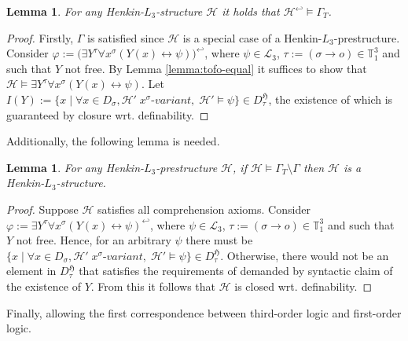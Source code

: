 \documentclass[11pt,a4paper]{article}
\newtheorem{lemma}[theorem]{Lemma}
\newcommand{\tofo}{\hookleftarrow}
\begin{document}
\begin{lemma}
\label{lemma:gammaT-sat}
For any Henkin-$L_3$-structure $\mathcal{H}$  it holds that $\mathcal{H}^{\tofo} \models \Gamma_T$.
\end{lemma}
\begin{proof}
Firstly, $\Gamma$ is satisfied since $\mathcal{H}$ is a special case of a Henkin-$L_3$-prestructure. Consider $\varphi:=\big( \exists Y^{\tau} \forall x^{\sigma} (Y(x) \leftrightarrow \psi)\big)^{\tofo}$, where $\psi \in \mathcal{L}_3$,  $\tau:= (\sigma \to o) \in \mathbb{T}_1^3$ and such that $Y$ not free. By Lemma \ref{lemma:tofo-equal} it suffices to show that $\mathcal{H} \models \exists Y^{\tau} \forall x^{\sigma} (Y(x) \leftrightarrow \psi)$. Let  $I(Y):=\{x \mid \forall x \in D_{\sigma},\mathcal{H}' \; x^{\sigma}\textit{-variant} ,\; \mathcal{H}'\models \psi \}\in D_{\tau}^{\mathfrak{H}}$, the existence of which is guaranteed by closure wrt. definability.  
\end{proof}

Additionally, the following lemma is needed.

\begin{lemma}
\label{lemma:compre-structure}
For any Henkin-$L_3$-prestructure $\mathcal{H}$, if $\mathcal{H} \models \Gamma_T\setminus \Gamma$ then $\mathcal{H}$ is a Henkin-$L_3$-structure.
\end{lemma}
\begin{proof}
Suppose $\mathcal{H}$ satisfies all comprehension axioms. Consider $\varphi:=\exists Y^{\tau} \forall x^{\sigma} (Y(x) \leftrightarrow \psi)^{\tofo}$, where $\psi \in \mathcal{L}_3$,  $\tau:= (\sigma \to o) \in \mathbb{T}_1^3$ and such that $Y$ not free. Hence, for an arbitrary $\psi$ there must be $\{x \mid \forall x \in D_{\sigma},\mathcal{H}' \; x^{\sigma}\textit{-variant} ,\; \mathcal{H}'\models \psi \}\in D_{\tau}^{\mathfrak{H}}$. Otherwise, there would not be an element in $ D_{\tau}^{\mathfrak{H}}$ that satisfies the requirements of demanded by syntactic claim of the existence of $Y$. From this it follows that $\mathcal{H}$ is closed wrt. definability.
\end{proof}

Finally, allowing the first correspondence between third-order logic and first-order logic.
\end{document}
